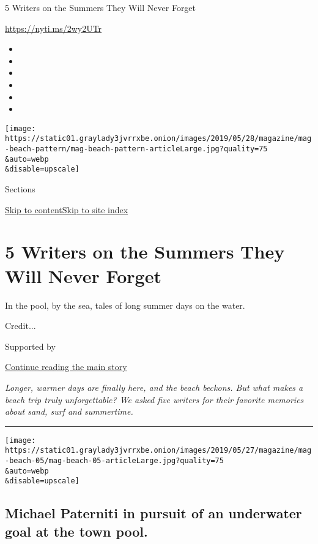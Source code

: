 5 Writers on the Summers They Will Never Forget

\url{https://nyti.ms/2wy2UTr}

\begin{itemize}
\item
\item
\item
\item
\item
\item
\end{itemize}

\texttt{[image: https://static01.graylady3jvrrxbe.onion/images/2019/05/28/magazine/mag-beach-pattern/mag-beach-pattern-articleLarge.jpg?quality=75\\\&auto=webp\\\&disable=upscale]}

Sections

\protect\hyperlink{site-content}{Skip to
content}\protect\hyperlink{site-index}{Skip to site index}

\hypertarget{5-writers-on-the-summers-they-will-never-forget}{%
\section{5 Writers on the Summers They Will Never
Forget}\label{5-writers-on-the-summers-they-will-never-forget}}

In the pool, by the sea, tales of long summer days on the water.

Credit...

Supported by

\protect\hyperlink{after-sponsor}{Continue reading the main story}

\emph{Longer, warmer days are finally here, and the beach beckons. But
what makes a beach trip truly unforgettable? We asked five writers for
their favorite memories about sand, surf and summertime.}

\begin{center}\rule{0.5\linewidth}{\linethickness}\end{center}

\texttt{[image: https://static01.graylady3jvrrxbe.onion/images/2019/05/27/magazine/mag-beach-05/mag-beach-05-articleLarge.jpg?quality=75\\\&auto=webp\\\&disable=upscale]}

\hypertarget{michael-paterniti-in-pursuit-of-an-underwater-goal-at-the-town-pool}{%
\subsection{Michael Paterniti in pursuit of an underwater goal at the
town
pool.}\label{michael-paterniti-in-pursuit-of-an-underwater-goal-at-the-town-pool}}

